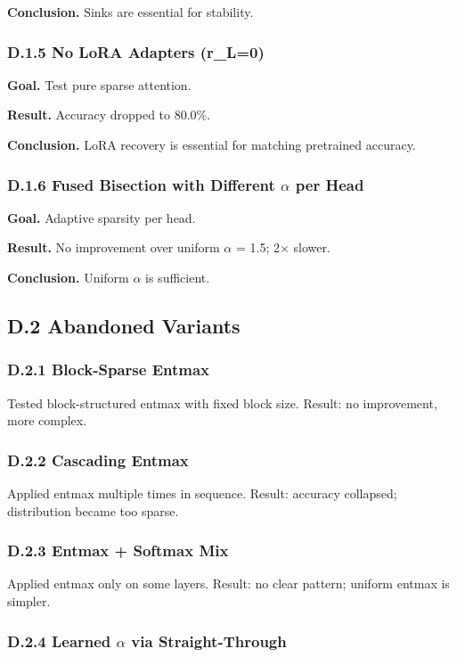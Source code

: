 \textbf{Conclusion.} Sinks are essential for stability.

\subsubsection{D.1.5 No LoRA Adapters (r\_L=0)}

\textbf{Goal.} Test pure sparse attention.

\textbf{Result.} Accuracy dropped to 80.0\%.

\textbf{Conclusion.} LoRA recovery is essential for matching pretrained accuracy.

\subsubsection{D.1.6 Fused Bisection with Different $\alpha$ per Head}

\textbf{Goal.} Adaptive sparsity per head.

\textbf{Result.} No improvement over uniform $\alpha$ = 1.5; 2$\times$ slower.

\textbf{Conclusion.} Uniform $\alpha$ is sufficient.

\subsection{D.2 Abandoned Variants}

\subsubsection{D.2.1 Block-Sparse Entmax}

Tested block-structured entmax with fixed block size. Result: no improvement, 
more complex.

\subsubsection{D.2.2 Cascading Entmax}

Applied entmax multiple times in sequence. Result: accuracy collapsed; 
distribution became too sparse.

\subsubsection{D.2.3 Entmax + Softmax Mix}

Applied entmax only on some layers. Result: no clear pattern; uniform 
entmax is simpler.

\subsubsection{D.2.4 Learned $\alpha$ via Straight-Through}

